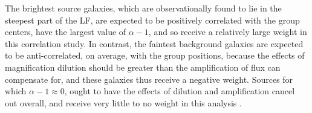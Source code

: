 \begin{table}
  \begin{center}


   \caption[Luminosity Function Parameters]{{\bf Luminosity Function Parameters.} \ac{LF} (Schechter) parameters from external \ac{LBG} measurements. $^a$ \ac{LF} parameters from \protect \citet{vanderBurg10}. $^b$ \ac{LF} parameters from \protect \citet{Sawicki06}.}
 \label{LFtable2}
  \end{center}
\end{table}


The brightest source galaxies, which are observationally found to lie in the steepest part of the \ac{LF}, are expected to be positively correlated with the group centers, have the largest value of $\alpha-1$, and so receive a relatively large weight in this correlation study.  In contrast, the faintest background galaxies are expected to be anti-correlated, on average, with the group positions, because the effects of magnification dilution should be greater than the amplification of flux can compensate for, and these galaxies thus receive a negative weight.  Sources for which $\alpha-1 \approx 0$, ought to have the effects of dilution and amplification cancel out overall, and receive very little to no weight in this analysis \citep{Scranton05}. 

